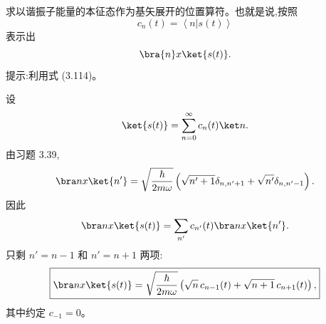 \begin{question}
求以谐振子能量的本征态作为基矢展开的位置算符。也就是说,按照
\[
c_n(t)=\left\langle n|s(t) \right\rangle
\]
表示出
\[
\bra{n}x\ket{s(t)}.
\]
提示:利用式 (3.114)。

\par\smallskip
{}

\begin{solution}
设
\[
\ket{s(t)}=\sum_{n=0}^{\infty}c_n(t)\ket n.
\]
由习题 3.39,
\[
\bra n x\ket{n'}=\sqrt{\frac{\hbar}{2m\omega}}
\left(\sqrt{n'+1}\delta_{n,n'+1}+\sqrt{n'}\delta_{n,n'-1}\right).
\]
因此
\[
\bra n x\ket{s(t)}=\sum_{n'}c_{n'}(t)\bra n x\ket{n'}.
\]
只剩 $n'=n-1$ 和 $n'=n+1$ 两项:
\[
\boxed{\bra n x\ket{s(t)}=
\sqrt{\frac{\hbar}{2m\omega}}
\left(\sqrt n\,c_{n-1}(t)+\sqrt{n+1}\,c_{n+1}(t)\right),}
\]
其中约定 $c_{-1}=0$。
\end{solution}
\end{question}

